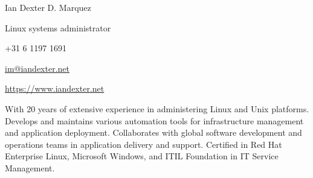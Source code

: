 \documentclass[10pt, a4paper, final]{article}
\begin{document}
\begin{minipage}[c]{0.5\textwidth}
  \begin{flushleft}\begin{spacing}{1}
    \Huge Ian Dexter D. Marquez

    \Large Linux systems administrator
  \end{spacing}\end{flushleft}
\end{minipage}
\begin{minipage}[c]{0.5\textwidth}
  \begin{flushright}\begin{spacing}{1}\small
    +31 6 1197 1691 

    \href{mailto:im@iandexter.net}{im@iandexter.net} 

    \href{https://www.iandexter.net}{https://www.iandexter.net} 
  \end{spacing}\end{flushright}
\end{minipage}
\vspace{1em}
\hrulefill

With 20 years of extensive experience in administering Linux and Unix platforms. Develops and maintains various automation tools for infrastructure management and application deployment. Collaborates with global software development and operations teams in application delivery and support. Certified in Red Hat Enterprise Linux, Microsoft Windows, and ITIL Foundation in IT Service Management.

\vspace{1.5em}
\end{document}
